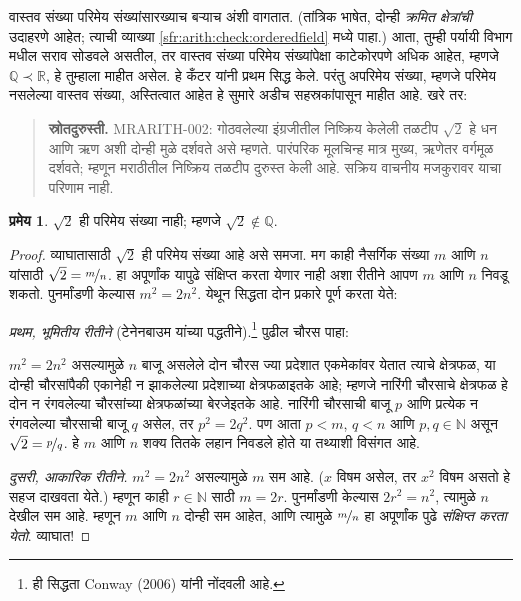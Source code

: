 \documentclass[11pt,a4paper,openany]{book}
\theoremstyle{definition}
\newtheorem{thm}[defn]{प्रमेय}
\newcommand{\Nat}{\mathbb{N}}
\newcommand{\Rat}{\mathbb{Q}}
\newcommand{\Real}{\mathbb{R}}
\newcommand{\cardless}[2]{#1 \prec #2}
\begin{document}
वास्तव संख्या परिमेय संख्यांसारख्याच बऱ्याच अंशी वागतात. (तांत्रिक
भाषेत, दोन्ही \emph{क्रमित क्षेत्रांची} उदाहरणे आहेत; त्याची व्याख्या
\ref{sfr:arith:check:orderedfield} मध्ये पाहा.) आता, तुम्ही पर्यायी विभाग
मधील सराव सोडवले असतील, तर वास्तव संख्या परिमेय संख्यांपेक्षा काटेकोरपणे
अधिक आहेत, म्हणजे $\cardless{\Rat}{\Real}$, हे तुम्हाला माहीत असेल.
हे कँटर यांनी प्रथम सिद्ध केले. परंतु अपरिमेय संख्या, म्हणजे परिमेय
नसलेल्या वास्तव संख्या, अस्तित्वात आहेत हे सुमारे अडीच सहस्रकांपासून
माहीत आहे. खरे तर:
\begin{quote}\small\textbf{स्रोतदुरुस्ती.} MRARITH-002: गोठवलेल्या इंग्रजीतील निष्क्रिय केलेली तळटीप $\sqrt{2}$ हे धन आणि ऋण अशी दोन्ही मुळे दर्शवते असे म्हणते. पारंपरिक मूलचिन्ह मात्र मुख्य, ऋणेतर वर्गमूळ दर्शवते; म्हणून मराठीतील निष्क्रिय तळटीप दुरुस्त केली आहे. सक्रिय वाचनीय मजकुरावर याचा परिणाम नाही.\end{quote}
\begin{thm}\label{sfr:arith:real:root2irrational}
$\sqrt{2}$ ही परिमेय संख्या नाही; म्हणजे $\sqrt{2} \notin \Rat$.
\end{thm}

\begin{proof}
व्याघातासाठी $\sqrt{2}$ ही परिमेय संख्या आहे असे समजा. मग काही नैसर्गिक
संख्या $m$ आणि $n$ यांसाठी $\sqrt{2} = \nicefrac{m}{n}$. हा अपूर्णांक
यापुढे संक्षिप्त करता येणार नाही अशा रीतीने आपण $m$ आणि $n$ निवडू शकतो.
पुनर्मांडणी केल्यास $m^{2} = 2n^{2}$. येथून सिद्धता दोन प्रकारे पूर्ण
करता येते:

\emph{प्रथम, भूमितीय रीतीने} (टेनेनबाउम यांच्या पद्धतीने).\footnote{ही
सिद्धता Conway (2006) यांनी नोंदवली आहे.} पुढील चौरस पाहा:
\begin{center}
\end{center}
$m^2 = 2n^2$ असल्यामुळे $n$ बाजू असलेले दोन चौरस ज्या प्रदेशात
एकमेकांवर येतात त्याचे क्षेत्रफळ, या दोन्ही चौरसांपैकी एकानेही न झाकलेल्या
प्रदेशाच्या क्षेत्रफळाइतके आहे; म्हणजे नारिंगी चौरसाचे क्षेत्रफळ हे दोन
न रंगवलेल्या चौरसांच्या क्षेत्रफळांच्या बेरजेइतके आहे. नारिंगी चौरसाची
बाजू $p$ आणि प्रत्येक न रंगवलेल्या चौरसाची बाजू $q$ असेल, तर $p^2 =
2q^2$. पण आता $p < m$, $q < n$ आणि $p, q \in \Nat$ असून
$\sqrt{2} = \nicefrac{p}{q}$. हे $m$ आणि $n$ शक्य तितके लहान निवडले
होते या तथ्याशी विसंगत आहे.

\emph{दुसरी, आकारिक रीतीने.} $m^{2} = 2n^{2}$ असल्यामुळे $m$ सम आहे.
($x$ विषम असेल, तर $x^2$ विषम असतो हे सहज दाखवता येते.) म्हणून काही
$r \in \Nat$ साठी $m = 2r$. पुनर्मांडणी केल्यास $2r^2 = n^2$,
त्यामुळे $n$ देखील सम आहे. म्हणून $m$ आणि $n$ दोन्ही सम आहेत, आणि
त्यामुळे $\nicefrac{m}{n}$ हा अपूर्णांक पुढे \emph{संक्षिप्त करता येतो}.
व्याघात!
\end{proof}
\end{document}
